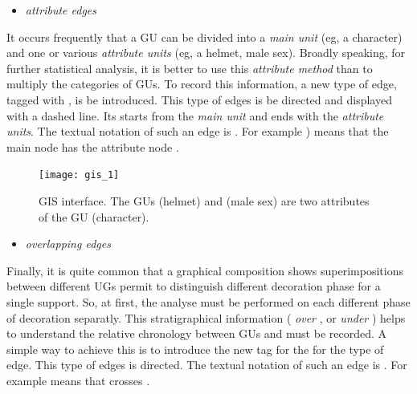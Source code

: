 \documentclass[article]{jss}\usepackage{knitr}
\begin{document}
\begin{itemize}
  \item \emph{attribute edges}
\end{itemize}

It occurs frequently that a GU can be divided into a \emph{main unit} (eg, a character) and one or various \emph{attribute units} (eg, a helmet, male sex). Broadly speaking, for further statistical analysis, it is better to use this \emph{attribute method} than to multiply the categories of GUs. To record this information, a new type of edge, tagged with , is be introduced. This type of edges is be directed and displayed with a dashed line. Its starts from the \emph{main unit} and ends with the \emph{attribute units}. The textual notation of such an edge is . For example ) means that the main node  has the attribute node .

\begin{figure}[H] 
\centering
\texttt{[image: gis\_1]}
\caption{\label{fig:gis1} GIS interface. The GUs  (helmet) and  (male sex) are two attributes of the GU  (character).}
\end{figure}

\begin{itemize}
  \item \emph{overlapping edges}
\end{itemize}

Finally, it is quite common that a graphical composition shows superimpositions between different UGs permit to distinguish different decoration phase for a single support. So, at first, the analyse must be performed on each different phase of decoration separatly. This stratigraphical information ( \emph{over} , or  \emph{under} ) helps to understand the relative chronology between GUs and must be recorded. A simple way to achieve this is to introduce the new tag  for the for the type of edge. This type of edges is directed. The textual notation of such an edge is . For example  means that  crosses .
\end{document}
